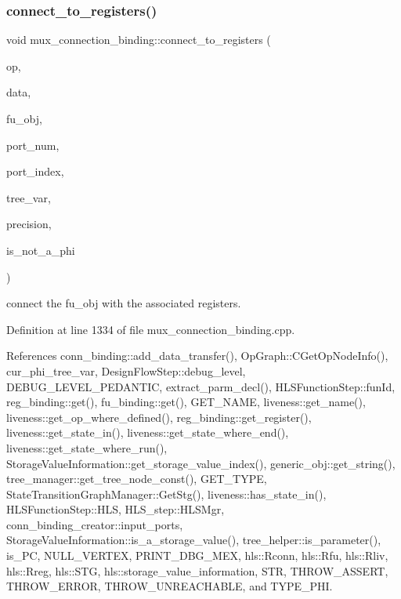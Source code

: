 \subsubsection{\texorpdfstring{connect\+\_\+to\+\_\+registers()}{connect\_to\_registers()}}
{\footnotesize\ttfamily void mux\+\_\+connection\+\_\+binding\+::connect\+\_\+to\+\_\+registers (\begin{DoxyParamCaption}\item[{\hyperlink{graph_8hpp_abefdcf0544e601805af44eca032cca14}{vertex}}]{op,  }\item[{const \hyperlink{op__graph_8hpp_a9a0b240622c47584bee6951a6f5de746}{Op\+Graph\+Const\+Ref}}]{data,  }\item[{\hyperlink{generic__obj_8hpp_acb533b2ef8e0fe72e09a04d20904ca81}{generic\+\_\+obj\+Ref}}]{fu\+\_\+obj,  }\item[{unsigned int}]{port\+\_\+num,  }\item[{unsigned int}]{port\+\_\+index,  }\item[{unsigned int}]{tree\+\_\+var,  }\item[{unsigned int}]{precision,  }\item[{const bool}]{is\+\_\+not\+\_\+a\+\_\+phi }\end{DoxyParamCaption})\hspace{0.3cm}{\ttfamily [private]}}



connect the fu\+\_\+obj with the associated registers. 



Definition at line 1334 of file mux\+\_\+connection\+\_\+binding.\+cpp.



References conn\+\_\+binding\+::add\+\_\+data\+\_\+transfer(), Op\+Graph\+::\+C\+Get\+Op\+Node\+Info(), cur\+\_\+phi\+\_\+tree\+\_\+var, Design\+Flow\+Step\+::debug\+\_\+level, D\+E\+B\+U\+G\+\_\+\+L\+E\+V\+E\+L\+\_\+\+P\+E\+D\+A\+N\+T\+IC, extract\+\_\+parm\+\_\+decl(), H\+L\+S\+Function\+Step\+::fun\+Id, reg\+\_\+binding\+::get(), fu\+\_\+binding\+::get(), G\+E\+T\+\_\+\+N\+A\+ME, liveness\+::get\+\_\+name(), liveness\+::get\+\_\+op\+\_\+where\+\_\+defined(), reg\+\_\+binding\+::get\+\_\+register(), liveness\+::get\+\_\+state\+\_\+in(), liveness\+::get\+\_\+state\+\_\+where\+\_\+end(), liveness\+::get\+\_\+state\+\_\+where\+\_\+run(), Storage\+Value\+Information\+::get\+\_\+storage\+\_\+value\+\_\+index(), generic\+\_\+obj\+::get\+\_\+string(), tree\+\_\+manager\+::get\+\_\+tree\+\_\+node\+\_\+const(), G\+E\+T\+\_\+\+T\+Y\+PE, State\+Transition\+Graph\+Manager\+::\+Get\+Stg(), liveness\+::has\+\_\+state\+\_\+in(), H\+L\+S\+Function\+Step\+::\+H\+LS, H\+L\+S\+\_\+step\+::\+H\+L\+S\+Mgr, conn\+\_\+binding\+\_\+creator\+::input\+\_\+ports, Storage\+Value\+Information\+::is\+\_\+a\+\_\+storage\+\_\+value(), tree\+\_\+helper\+::is\+\_\+parameter(), is\+\_\+\+PC, N\+U\+L\+L\+\_\+\+V\+E\+R\+T\+EX, P\+R\+I\+N\+T\+\_\+\+D\+B\+G\+\_\+\+M\+EX, hls\+::\+Rconn, hls\+::\+Rfu, hls\+::\+Rliv, hls\+::\+Rreg, hls\+::\+S\+TG, hls\+::storage\+\_\+value\+\_\+information, S\+TR, T\+H\+R\+O\+W\+\_\+\+A\+S\+S\+E\+RT, T\+H\+R\+O\+W\+\_\+\+E\+R\+R\+OR, T\+H\+R\+O\+W\+\_\+\+U\+N\+R\+E\+A\+C\+H\+A\+B\+LE, and T\+Y\+P\+E\+\_\+\+P\+HI.



